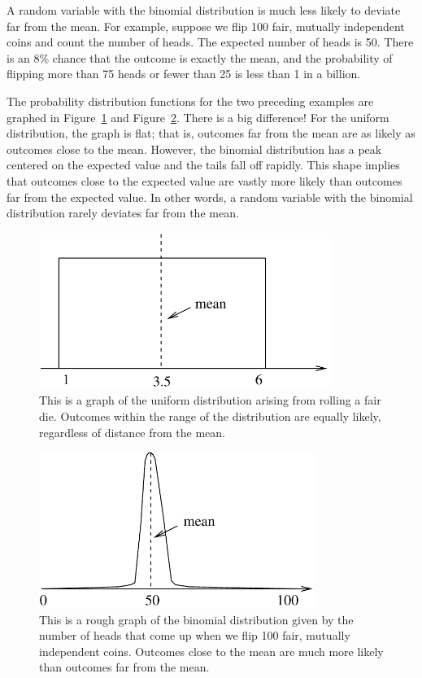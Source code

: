 \documentclass[11pt,twoside]{article}
\begin{document}
\begin{example}
  A random variable with the binomial distribution is much less likely
  to deviate far from the mean.  For example, suppose we flip 100
  fair, mutually independent coins and count the number of heads.  The
  expected number of heads is 50.  There is an 8\% chance that the
  outcome is exactly the mean, and the probability of flipping more
  than 75 heads or fewer than 25 is less than 1 in a billion.
\end{example}

The probability distribution functions for the two preceding examples
are graphed in Figure~\ref{fig:uniform} and Figure~\ref{fig:binom2}.
There is a big difference!  For the uniform distribution, the graph is
flat; that is, outcomes far from the mean are as likely as outcomes
close to the mean.  However, the binomial distribution has a peak
centered on the expected value and the tails fall off rapidly.  This
shape implies that outcomes close to the expected value are vastly
more likely than outcomes far from the expected value.  In other
words, a random variable with the binomial distribution rarely
deviates far from the mean.
\begin{figure}
  \centerline{\includegraphics[height=2in]{figures/uniform}}
  \caption{This is a graph of the uniform distribution arising from
    rolling a fair die.  Outcomes within the range of the distribution
    are equally likely, regardless of distance from the mean.}
  \label{fig:uniform}
\end{figure}
\begin{figure}
  \centerline{\includegraphics[height=2in]{figures/binom2}}
  \caption{This is a rough graph of the binomial distribution given by
    the number of heads that come up when we flip 100 fair, mutually
    independent coins.  Outcomes close to the mean are much more
    likely than outcomes far from the mean.}
  \label{fig:binom2}
\end{figure}
\fi
\end{document}
